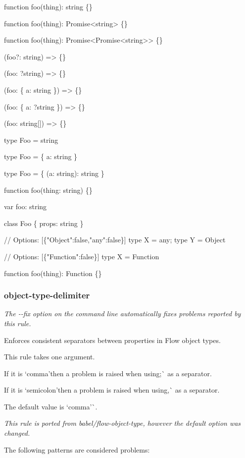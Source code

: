 \begin{DoxyCode}
function foo(thing): string \{\}

function foo(thing): Promise<string> \{\}

function foo(thing): Promise<Promise<string>> \{\}

(foo?: string) => \{\}

(foo: ?string) => \{\}

(foo: \{ a: string \}) => \{\}

(foo: \{ a: ?string \}) => \{\}

(foo: string[]) => \{\}

type Foo = string

type Foo = \{ a: string \}

type Foo = \{ (a: string): string \}

function foo(thing: string) \{\}

var foo: string

class Foo \{ props: string \}

// Options: [\{"Object":false,"any":false\}]
type X = any; type Y = Object

// Options: [\{"Function":false\}]
type X = Function

function foo(thing): Function \{\}
\end{DoxyCode}


\label{_eslint-plugin-flowtype-rules-object-type-delimiter}%
 \subsubsection*{{\ttfamily object-\/type-\/delimiter}}

{\itshape The {\ttfamily -\/-\/fix} option on the command line automatically fixes problems reported by this rule.}

Enforces consistent separators between properties in Flow object types.

This rule takes one argument.

If it is `\textquotesingle{}comma'{\ttfamily then a problem is raised when using};\`{} as a separator.

If it is `\textquotesingle{}semicolon'{\ttfamily then a problem is raised when using},\`{} as a separator.

The default value is `\textquotesingle{}comma'\`{}.

{\itshape This rule is ported from {\ttfamily babel/flow-\/object-\/type}, however the default option was changed.}

The following patterns are considered problems\+:



